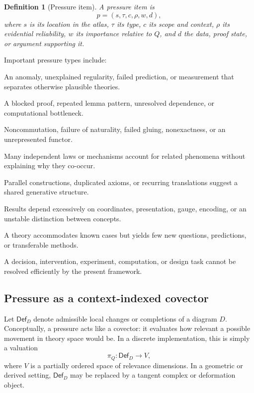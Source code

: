 \documentclass[11pt]{article}
\newtheorem{definition}{Definition}[section]
\newcommand{\Def}{\mathsf{Def}}
\begin{document}
\begin{definition}[Pressure item]
A pressure item is
\begin{equation}
p=(s,\tau,c,\rho,w,d),
\end{equation}
where $s$ is its location in the atlas, $\tau$ its type, $c$ its scope and context, $\rho$ its evidential
reliability, $w$ its importance relative to $Q$, and $d$ the data, proof state, or argument supporting it.
\end{definition}

Important pressure types include:
\begin{description}[leftmargin=2.6cm,style=nextline]
  \item[Empirical pressure.] An anomaly, unexplained regularity, failed prediction, or measurement that
  separates otherwise plausible theories.
  \item[Inferential pressure.] A blocked proof, repeated lemma pattern, unresolved dependence, or
  computational bottleneck.
  \item[Structural pressure.] Noncommutation, failure of naturality, failed gluing, nonexactness, or an
  unrepresented functor.
  \item[Explanatory pressure.] Many independent laws or mechanisms account for related phenomena
  without explaining why they co-occur.
  \item[Unification pressure.] Parallel constructions, duplicated axioms, or recurring translations suggest
  a shared generative structure.
  \item[Representational pressure.] Results depend excessively on coordinates, presentation, gauge,
  encoding, or an unstable distinction between concepts.
  \item[Generative pressure.] A theory accommodates known cases but yields few new questions,
  predictions, or transferable methods.
  \item[Pragmatic pressure.] A decision, intervention, experiment, computation, or design task cannot be
  resolved efficiently by the present framework.
\end{description}

\subsection{Pressure as a context-indexed covector}

Let $\Def_D$ denote admissible local changes or completions of a diagram $D$. Conceptually, a pressure
acts like a covector: it evaluates how relevant a possible movement in theory space would be. In a
discrete implementation, this is simply a valuation
\begin{equation}
\pi_Q:\Def_D\longrightarrow V,
\end{equation}
where $V$ is a partially ordered space of relevance dimensions. In a geometric or derived setting,
$\Def_D$ may be replaced by a tangent complex or deformation object.
\end{document}
